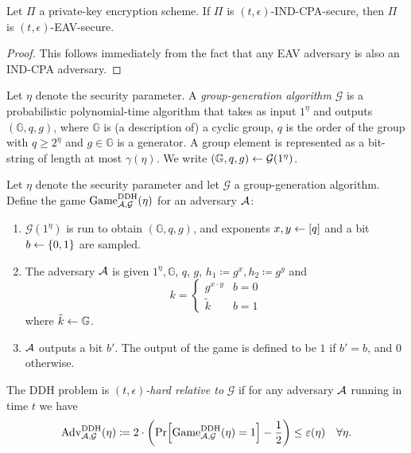 \begin{lemma}
	Let $\Pi$ a private-key encryption scheme. If $\Pi$ is $(t, \epsilon)$-IND-CPA-secure, then $\Pi$ is $(t, \epsilon)$-EAV-secure.
\end{lemma}
\begin{proof}
	This follows immediately from the fact that any EAV adversary is also an IND-CPA adversary.
\end{proof}

\begin{definition}
	Let $\eta$ denote the security parameter. A \emph{group-generation algorithm} $\mathcal{G}$ is a probabilistic polynomial-time algorithm that takes as input $1^\eta$ and outputs $(\mathbb{G}, q, g)$, where $\mathbb{G}$ is (a description of) a cyclic group, $q$ is the order of the group with $q \ge 2^\eta$ and $g \in \mathbb{G}$ is a generator. A group element is represented as a bit-string of length at most $\gamma(\eta)$. We write $(\mathbb{G}, q, g) \leftarrow \mathcal{G}(1^\eta)$.
\end{definition}

\begin{definition}
	Let $\eta$ denote the security parameter and let $\mathcal{G}$ a group-generation algorithm.
	Define the game $\mathrm{Game}_{\mathcal{A}, \mathcal{G}}^{\mathrm{DDH}}(\eta)$ for an adversary $\mathcal{A}$:
	\begin{enumerate}[1.]
		\item $\mathcal{G}(1^\eta)$ is run to obtain $(\mathbb{G}, q, g)$, and exponents $x, y \leftarrow [q]$ and a bit $b \leftarrow \{0, 1\}$ are sampled.
		\item The adversary $\mathcal{A}$ is given $1^\eta, \mathbb{G}$, $q$, $g$, $h_1 \coloneqq g^x, h_2 \coloneqq g^y$ and
		      \[
			      k = \begin{cases}
				      g^{x \cdot y} & b = 0 \\
				      \tilde{k}     & b = 1
			      \end{cases}
		      \]
		      where $\tilde{k} \leftarrow \mathbb{G}$.
		\item $\mathcal{A}$ outputs a bit $b'$. The output of the game is defined to be $1$ if $b' = b$, and $0$ otherwise.
	\end{enumerate}
\end{definition}

\begin{definition}
	The DDH problem is \emph{$(t, \epsilon)$-hard relative to} $\mathcal{G}$ if for any adversary $\mathcal{A}$ running in time $t$ we have
	\begin{align*}
		\advantage{\mathcal{G}}{DDH}(\eta) \coloneqq 2 \cdot \left(\pr{\game{\mathcal{G}}{DDH}(\eta) = 1} - \frac{1}{2}\right) \le \epsilon(\eta) \quad \forall \eta.
	\end{align*}
\end{definition}

